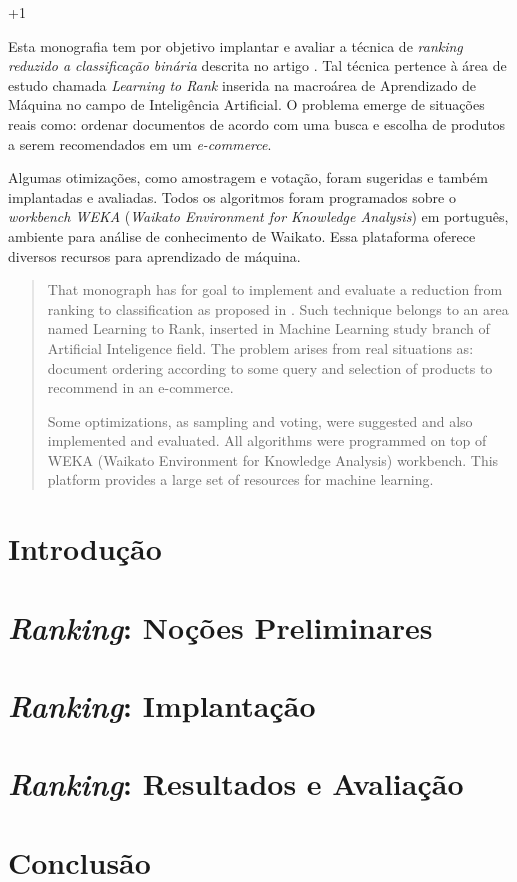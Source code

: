 \documentclass[12pt, a4paper, normaltoc, capchap, capsec, times]{abnt}
\begin{document}
\looseness+1

\begin{resumo}
Esta monografia tem por objetivo implantar e avaliar a técnica de \emph{ranking reduzido a classificação binária} descrita no artigo \cite{langford08}. Tal técnica pertence à área de estudo chamada \emph{Learning to Rank} inserida na macroárea de Aprendizado de Máquina no campo de Inteligência Artificial. O problema emerge de situações reais como: ordenar documentos de acordo com uma busca e escolha de produtos a serem recomendados em um \emph{e-commerce}.

Algumas otimizações, como amostragem e votação, foram sugeridas e também implantadas e avaliadas. Todos os algoritmos foram programados sobre o \emph{workbench WEKA} (\emph{Waikato Environment for Knowledge Analysis}) em português, ambiente para análise de conhecimento de Waikato. Essa plataforma oferece diversos recursos para aprendizado de máquina.
\end{resumo}

\begin{abstract}
That monograph has for goal to implement and evaluate a reduction from ranking to classification as proposed in \cite{langford08}. Such technique belongs to an area named Learning to Rank, inserted in Machine Learning study branch of Artificial Inteligence field. The problem arises from real situations as: document ordering according to some query and selection of products to recommend in an e-commerce.

Some optimizations, as sampling and voting, were suggested and also implemented and evaluated. All algorithms were programmed on top of WEKA (Waikato Environment for Knowledge Analysis) workbench. This platform provides a large set of resources for machine learning.
\end{abstract}

\chapter{Introdução}
\label{chap:introducao}


\chapter{\emph{Ranking}: Noções Preliminares}
\label{chap:nocoes_preliminares}


\chapter{\emph{Ranking}: Implantação}
\label{chap:implantacao}


\chapter{\emph{Ranking}: Resultados e Avaliação}
\label{chap:avaliacao}


\chapter{Conclusão}
\label{chap:conclusao}



\end{document}

